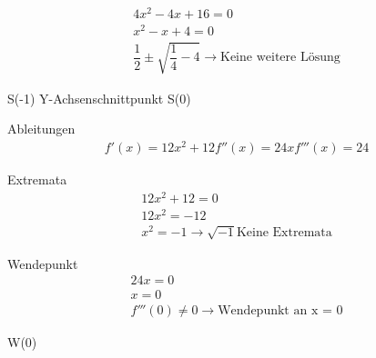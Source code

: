 \documentclass[11pt,a4paper]{article}
\begin{document}
\begin{eqnarray}
4x^2 - 4x + 16 = 0\\
x^2 - x + 4 = 0\\
\dfrac{1}{2} \pm \sqrt{\dfrac{1}{4} - 4} \rightarrow \text{Keine weitere Lösung}
\end{eqnarray}

S(-1) Y-Achsenschnittpunkt S(0)

Ableitungen
\begin{eqnarray}
f'(x) = 12x^2 + 12
f''(x) = 24x
f'''(x) = 24
\end{eqnarray}

Extremata
\begin{eqnarray}
12x^2 + 12 = 0\\
12x^2 = -12\\
x^2 = -1 \rightarrow \sqrt{-1} \text{Keine Extremata}
\end{eqnarray}

Wendepunkt
\begin{eqnarray}
24x = 0\\
x = 0\\
f'''(0) \neq 0 \rightarrow \text{Wendepunkt an x = 0}
\end{eqnarray}

W(0)
\end{document}

